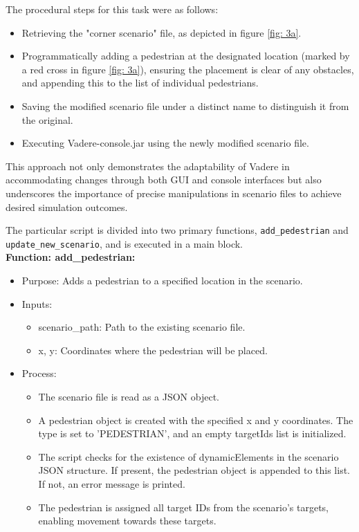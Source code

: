 The procedural steps for this task were as follows:
\begin{itemize}
    \item Retrieving the "corner scenario" file, as depicted in figure \ref{fig: 3a}.
    \item Programmatically adding a pedestrian at the designated location (marked by a red cross in figure \ref{fig: 3a}), ensuring the placement is clear of any obstacles, and appending this to the list of individual pedestrians.
    \item Saving the modified scenario file under a distinct name to distinguish it from the original.
    \item Executing Vadere-console.jar using the newly modified scenario file.
\end{itemize}

This approach not only demonstrates the adaptability of Vadere in accommodating changes through both GUI and console interfaces but also underscores the importance of precise manipulations in scenario files to achieve desired simulation outcomes.

The particular script is divided into two primary functions, \texttt{add\_pedestrian} and \texttt{update\_new\_scenario}, and is executed in a main block. \\ 

\textbf{Function: add\_pedestrian:}
\begin{itemize}
    \item Purpose: Adds a pedestrian to a specified location in the scenario.
    \item Inputs:
    \begin{itemize}
        \item scenario\_path: Path to the existing scenario file.
        \item x, y: Coordinates where the pedestrian will be placed.
    \end{itemize}
    \item Process:
    \begin{itemize}
        \item The scenario file is read as a JSON object.
        \item A pedestrian object is created with the specified x and y coordinates. The type is set to 'PEDESTRIAN', and an empty targetIds list is initialized.
        \item The script checks for the existence of dynamicElements in the scenario JSON structure. If present, the pedestrian object is appended to this list. If not, an error message is printed.
        \item The pedestrian is assigned all target IDs from the scenario's targets, enabling movement towards these targets.
    \end{itemize}
\end{itemize}

